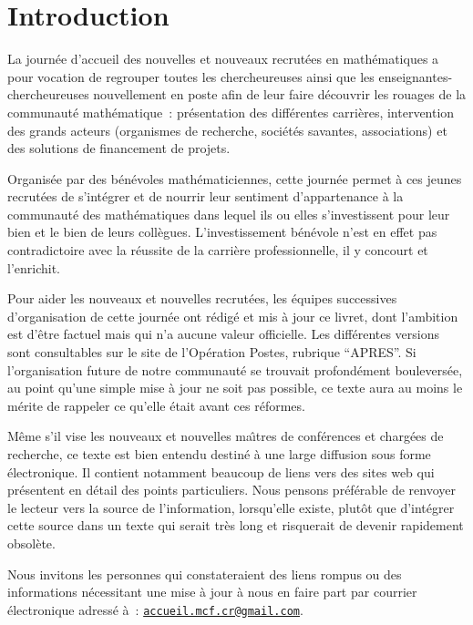 \documentclass[11pt]{book}
\renewcommand*{\mp}{\textperiodcentered}
\begin{document}
\setlength{\parskip}{.15cm}

\chapter*{Introduction}

La journ\'ee d'accueil des nouvelles et nouveaux recrut\'e\mp e\mp s en math\'ematiques a pour vocation de regrouper
tou\mp te\mp s les chercheur\mp euse\mp s ainsi que les enseignant\mp e\mp s-chercheur\mp euse\mp s nouvellement en poste afin de leur faire d\'ecouvrir
les rouages de la communaut\'e math\'ematique~: pr\'esentation des diff\'erentes carri\`eres, 
intervention des grands acteurs (organismes de recherche, soci\'et\'es savantes, associations)
et des solutions de financement de projets. 

Organis\'ee par des b\'en\'evoles math\'ematicien\mp ne\mp s, cette journ\'ee permet 
\`a ces jeunes recrut\'e\mp e\mp s de s'int\'egrer et de nourrir leur sentiment d'appartenance
\`a la communaut\'e des math\'ematiques dans lequel ils ou elles s'investissent pour leur bien et le bien de leurs coll\`egues.
L'investissement b\'en\'evole n'est en effet pas contradictoire avec la r\'eussite de la carri\`ere professionnelle,
il y concourt et l'enrichit.

Pour aider les nouveaux et nouvelles recrut\'e\mp e\mp s, les \'equipes successives d'organisation de cette journ\'ee
ont r\'edig\'e et mis \`a jour ce livret, dont l'ambition est d'\^etre factuel mais qui n'a aucune valeur officielle. 
Les diff\'erentes versions sont consultables sur le site de l'Op\'eration Postes, rubrique ``APRES''. 
Si l'organisation future de notre communaut\'e se trouvait profond\'ement boulevers\'ee,
au point qu'une simple mise \`a jour ne soit pas
possible, ce texte aura au moins le m\'erite de rappeler
ce qu'elle \'etait avant ces r\'eformes.

M\^eme s'il vise les nouveaux et nouvelles ma\^\i  tres de conf\'erences et
charg\'e\mp e\mp s de recherche, ce texte est bien entendu destin\'e \`a une
large diffusion sous forme \'electronique. Il contient notamment
beaucoup de liens vers des sites web qui pr\'esentent en d\'etail
des points particuliers. Nous pensons pr\'ef\'erable de renvoyer le
lecteur vers la source de l'information, lorsqu'elle existe,
plut\^ot que d'int\'egrer cette source dans un texte qui serait tr\`es long et
risquerait de devenir rapidement obsol\`ete.

Nous invitons les personnes qui constateraient des liens rompus ou
des informations n\'eces\-si\-tant une mise \`a jour \`a nous en
faire part par courrier \'electronique adress\'e \`a~:
\href{mailto:accueil.mcf.cr@gmail.com}{\texttt{accueil.mcf.cr@gmail.com}}.
\end{document}

